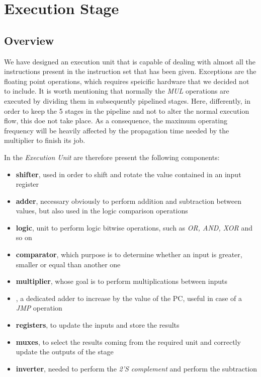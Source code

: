 \section{Execution Stage}
\label{chap_exu}

\subsection{Overview}
We have designed an execution unit that is capable of dealing with almost all the instructions present in the instruction set that has been given. Exceptions are the floating point operations, which requires speicific hardware that we decided not to include. It is worth mentioning that normally the \textit{MUL} operations are executed by dividing them in subsequently pipelined stages. Here, differently, in order to keep the 5 stages in the pipeline and not to alter the normal execution flow, this doe not take place. As a consequence, the maximum operating frequency will be heavily affected by the propagation time needed by the multiplier to finish its job.


In the \textit{Execution Unit} are therefore present the following components:
\begin{itemize}
	\item \textbf{shifter}, used in order to shift and rotate the value contained in an input register
	\item \textbf{adder}, necessary obviously to perform addition and subtraction between values, but also used in the logic comparison operations
	\item \textbf{logic}, unit to perform logic bitwise operations, such as \textit{OR, AND, XOR} and so on
	\item \textbf{comparator}, which purpose is to determine whether an input is greater, smaller or equal than another one
	\item \textbf{multiplier}, whose goal is to perform multiplications between inputs
	\item {}, a dedicated adder to increase by the value of the PC, useful in case of a \textit{JMP} operation
	\item \textbf{registers}, to update the inputs and store the results
	\item \textbf{muxes}, to select the results coming from the required unit and correctly update the outputs of the stage
	\item \textbf{inverter}, needed to perform the \textit{2'S complement} and perform the subtraction
\end{itemize}


